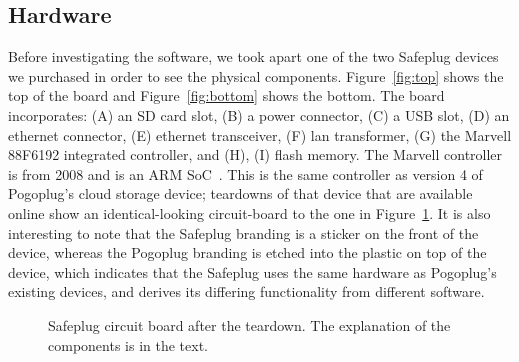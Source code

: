\documentclass[conference]{IEEEtran}
\begin{document}
\subsection{Hardware}
Before investigating the software, we took apart one of the two Safeplug devices we purchased in order to see the physical components.  Figure~\ref{fig:top} shows the top of the board and Figure~\ref{fig:bottom} shows the bottom.  The board incorporates: (A) an SD card slot, (B) a power connector, (C) a USB slot, (D) an ethernet connector, (E) ethernet transceiver, (F) lan transformer, (G) the Marvell 88F6192 integrated controller, and (H), (I) flash memory.  The Marvell controller is from 2008 and is an ARM SoC~\cite{marvellhw}. This is the same controller as version 4 of Pogoplug's cloud storage device; teardowns of that device that are available online show an identical-looking circuit-board to the one in Figure~\ref{fig:circuit}\cite{pogo4}.  It is also interesting to note that the Safeplug branding is a sticker on the front of the device, whereas the Pogoplug branding is etched into the plastic on top of the device, which indicates that the Safeplug uses the same hardware as Pogoplug's existing devices, and derives its differing functionality from different software.

\begin{figure}[tb]
\centering
{}
\qquad
{}
\caption{Safeplug circuit board after the teardown.  The explanation of the components is in the text.}
\label{fig:circuit}
\end{figure}
\end{document}
